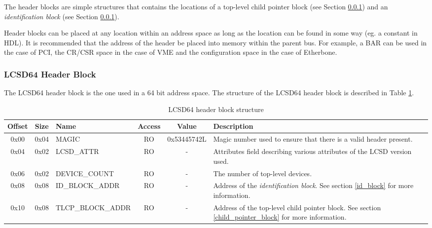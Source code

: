 \documentclass[a4paper, 12pt]{article}
\begin{document}
The header blocks are simple structures that contains the locations of a top-level
child pointer block (see Section \ref{}) and an \emph{identification block} (see Section \ref{}).

Header blocks can be placed at any location within an address space
as long as the location can be found in some way (eg. a constant in HDL).
It is recommended that the address of the header be placed into memory
within the parent bus. For example, a BAR can be used in the case of PCI,
the CR/CSR space in the case of VME and the configuration space in the case
of Etherbone.

\subsubsection{LCSD64 Header Block}
The LCSD64 header block is the one used in a 64 bit address space. The structure
of the LCSD64 header block is described in Table \ref{hdr_block_struct}.

\begin{center}
  \begin{savenotes}
    \begin{table}[!ht]\footnotesize
      \caption{LCSD64 header block structure}\label{hdr_block_struct}\centering
      \begin{adjustwidth}{-0.3in}{-1in}%
        \begin{tabular}{| c | c | l | c | c | p{5cm} |} \hline
        Offset & Size & Name & Access & Value & Description \\ \hline
        0x00 & 0x04 & MAGIC & RO & 0x53445742L & Magic number used to ensure that there is a valid header present. \\ \hline
        0x04 & 0x02 & LCSD\_ATTR & RO & - & Attributes field describing various attributes of the LCSD version used. \\ \hline
        0x06 & 0x02 & DEVICE\_COUNT & RO & - & The number of top-level devices. \\ \hline
        0x08 & 0x08 & ID\_BLOCK\_ADDR & RO & - & Address of the \emph{identification block}. See section \ref{id_block} for more information. \\ \hline
        0x10 & 0x08 & TLCP\_BLOCK\_ADDR & RO & - & Address of the top-level child pointer block. See section \ref{child_pointer_block} for more information. \\ \hline
        \end{tabular}
      \end{adjustwidth}
    \end{table}
  \end{savenotes}
\end{center}
\end{document}
